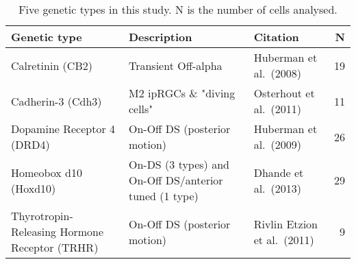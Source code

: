 \documentclass[11pt]{article}
\date{}
\begin{document}
\singlespacing

\doublespacing

\newcommand{\etal}{et al.\ }
\begin{table}
\centering
\begin{tabular}{p{4.5cm} p{4.5cm} lr}
  \toprule
  Genetic type & Description & Citation & N\\
  \midrule
  \footnotesize{Calretinin (CB2)} & \footnotesize{Transient Off-alpha}
  & \footnotesize{Huberman \etal (2008)}& 19\\
  \footnotesize{Cadherin-3 (Cdh3)} & \footnotesize{M2 ipRGCs \&
    "diving cells"} & \footnotesize{Osterhout \etal (2011)}&11\\
  \footnotesize{Dopamine Receptor 4 (DRD4)} & \footnotesize{On-Off
    DS (posterior motion)} & \footnotesize{Huberman
    \etal (2009)}&26\\
  \footnotesize{Homeobox d10 (Hoxd10)} & \footnotesize{On-DS (3 types)
    and On-Off DS/anterior tuned (1 type)} 
  & \footnotesize{Dhande \etal (2013)} & 29\\
  \footnotesize{Thyrotropin-Releasing Hormone Receptor (TRHR)} &
  \footnotesize{On-Off DS (posterior motion)}&
  \footnotesize{Rivlin Etzion \etal (2011)} & 9\\
  \bottomrule
\end{tabular}
\caption{Five genetic types in this study.  N is
  the number of cells analysed.}
\label{tab:geneticTypes}
\end{table}


\clearpage

\singlespacing
\end{document}
